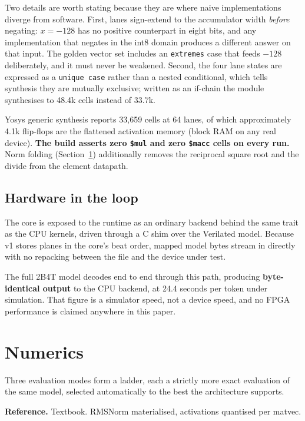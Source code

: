 \documentclass[10pt,twocolumn]{article}
\begin{document}
Two details are worth stating because they are where naive implementations
diverge from software. First, lanes sign-extend to the accumulator width
\emph{before} negating: $x = -128$ has no positive counterpart in eight bits,
and any implementation that negates in the int8 domain produces a different
answer on that input. The golden vector set includes an \texttt{extremes} case
that feeds $-128$ deliberately, and it must never be weakened. Second, the
four lane states are expressed as a \texttt{unique case} rather than a nested
conditional, which tells synthesis they are mutually exclusive; written as an
if-chain the module synthesises to 48.4k cells instead of 33.7k.

Yosys generic synthesis reports 33{,}659 cells at 64 lanes, of which
approximately 4.1k flip-flops are the flattened activation memory (block RAM on
any real device). \textbf{The build asserts zero \texttt{\$mul} and zero
\texttt{\$macc} cells on every run.} Norm folding
(Section~\ref{sec:numerics}) additionally removes the reciprocal square root
and the divide from the element datapath.

\subsection{Hardware in the loop}

The core is exposed to the runtime as an ordinary backend behind the same trait
as the CPU kernels, driven through a C shim over the Verilated model. Because
v1 stores planes in the core's beat order, mapped model bytes stream in
directly with no repacking between the file and the device under test.

The full 2B4T model decodes end to end through this path, producing
\textbf{byte-identical output} to the CPU backend, at 24.4 seconds per token
under simulation. That figure is a simulator speed, not a device speed, and no
FPGA performance is claimed anywhere in this paper.

\section{Numerics}
\label{sec:numerics}

Three evaluation modes form a ladder, each a strictly more exact evaluation of
the same model, selected automatically to the best the architecture supports.

\textbf{Reference.} Textbook. RMSNorm materialised, activations quantised per
matvec.
\end{document}
